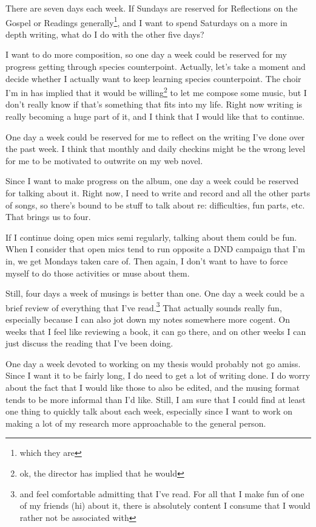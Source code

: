 \documentclass[12pt]{article}[titlepage]
\renewcommand{\,}{\textsuperscript{,}}
\begin{document}
There are seven days each week.
If Sundays are reserved for Reflections on the Gospel or Readings generally\footnote{which they are}, and I want to spend Saturdays on a more in depth writing, what do I do with the other five days?

I want to do more composition, so one day a week could be reserved for my progress getting through species counterpoint.
Actually, let's take a moment and decide whether I actually want to keep learning species counterpoint.
The choir I'm in has implied that it would be willing\footnote{ok, the director has implied that he would} to let me compose some music, but I don't really know if that's something that fits into my life.
Right now writing is really becoming a huge part of it, and I think that I would like that to continue.

One day a week could be reserved for me to reflect on the writing I've done over the past week.
I think that monthly and daily checkins might be the wrong level for me to be motivated to outwrite on my web novel.

Since I want to make progress on the album, one day a week could be reserved for talking about it. 
Right now, I need to write and record and all the other parts of songs, so there's bound to be stuff to talk about re: difficulties, fun parts, etc.
That brings us to four.

If I continue doing open mics semi regularly, talking about them could be fun.
When I consider that open mics tend to run opposite a DND campaign that I'm in, we get Mondays taken care of.
Then again, I don't want to have to force myself to do those activities or muse about them.

Still, four days a week of musings is better than one.
One day a week could be a brief review of everything that I've read.\footnote{and feel comfortable admitting that I've read. For all that I make fun of one of my friends (hi) about it, there is absolutely content I consume that I would rather not be associated with}
That actually sounds really fun, especially because I can also jot down my notes somewhere more cogent.
On weeks that I feel like reviewing a book, it can go there, and on other weeks I can just discuss the reading that I've been doing.

One day a week devoted to working on my thesis would probably not go amiss.
Since I want it to be fairly long, I do need to get a lot of writing done.
I do worry about the fact that I would like those to also be edited, and the musing format tends to be more informal than I'd like.
Still, I am sure that I could find at least one thing to quickly talk about each week, especially since I want to work on making a lot of my research more approachable to the general person.
\end{document}
